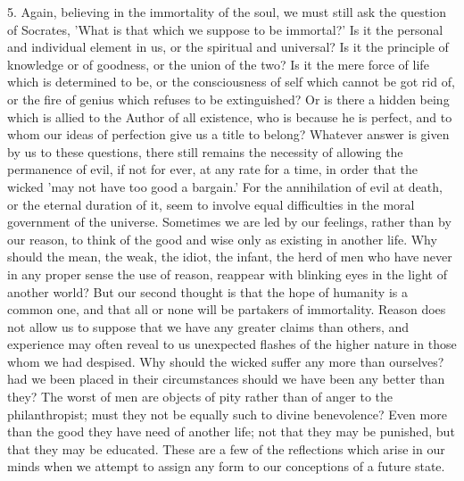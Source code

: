 \documentclass[11pt,letter]{article}
\begin{document}
\par  5. Again, believing in the immortality of the soul, we must still ask the question of Socrates, 'What is that which we suppose to be immortal?' Is it the personal and individual element in us, or the spiritual and universal? Is it the principle of knowledge or of goodness, or the union of the two? Is it the mere force of life which is determined to be, or the consciousness of self which cannot be got rid of, or the fire of genius which refuses to be extinguished? Or is there a hidden being which is allied to the Author of all existence, who is because he is perfect, and to whom our ideas of perfection give us a title to belong? Whatever answer is given by us to these questions, there still remains the necessity of allowing the permanence of evil, if not for ever, at any rate for a time, in order that the wicked 'may not have too good a bargain.' For the annihilation of evil at death, or the eternal duration of it, seem to involve equal difficulties in the moral government of the universe. Sometimes we are led by our feelings, rather than by our reason, to think of the good and wise only as existing in another life. Why should the mean, the weak, the idiot, the infant, the herd of men who have never in any proper sense the use of reason, reappear with blinking eyes in the light of another world? But our second thought is that the hope of humanity is a common one, and that all or none will be partakers of immortality. Reason does not allow us to suppose that we have any greater claims than others, and experience may often reveal to us unexpected flashes of the higher nature in those whom we had despised. Why should the wicked suffer any more than ourselves? had we been placed in their circumstances should we have been any better than they? The worst of men are objects of pity rather than of anger to the philanthropist; must they not be equally such to divine benevolence? Even more than the good they have need of another life; not that they may be punished, but that they may be educated. These are a few of the reflections which arise in our minds when we attempt to assign any form to our conceptions of a future state.
\end{document}
